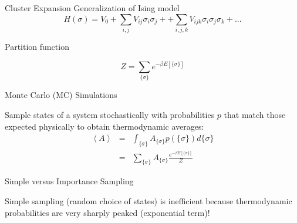 \documentclass[aspectratio=169]{beamer}
\begin{document}
\begin{frame}{Cluster Expansion}
Generalization of Ising model
\begin{equation*}
H(\sigma) = V_0 + \sum_{i,j} V_{ij} \sigma_i \sigma_j + + \sum_{i,j,k} V_{ijk} \sigma_i \sigma_j \sigma_k + ...
\end{equation*} 

Partition function

\begin{equation*}
Z = \sum_{\{\sigma\}} e^{-\beta E[\{\sigma\}]}
\end{equation*} 

\end{frame} 


\begin{frame}{Monte Carlo (MC) Simulations}

Sample states of a system stochastically with probabilities $p$ that match those expected physically to obtain thermodynamic averages:
\begin{eqnarray*}
\left< A \right> & = & \int_{\{\sigma\}} A_{\{\sigma\}} p(\{\sigma\}) d \{\sigma\}\\
& = & \sum_{\{\sigma\}} A_{\{\sigma\}} \frac{e^{-\beta E[\{\sigma\}]}}{Z} 
\end{eqnarray*} 

\end{frame} 

\begin{frame}{Simple versus Importance Sampling}

Simple sampling (random choice of states) is inefficient because thermodynamic probabilities are very sharply peaked (exponential term)!

\begin{figure}
\end{figure} 

\end{frame} 
\end{document}
